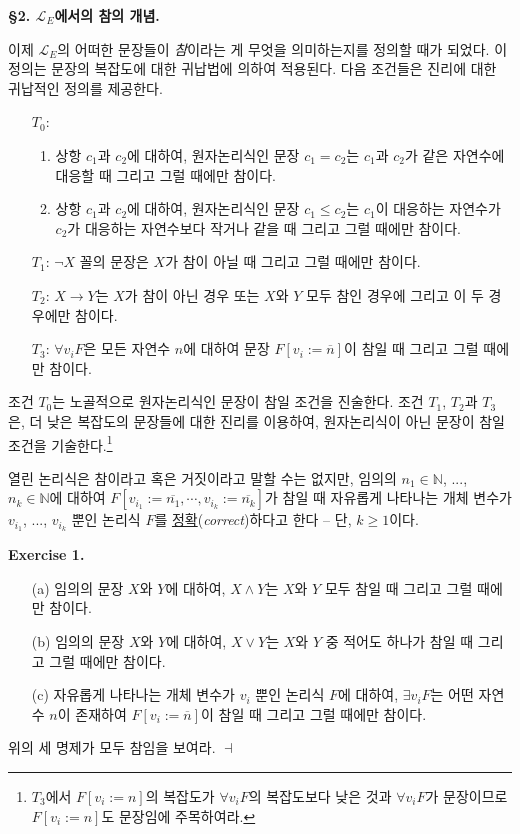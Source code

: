 \documentclass[12pt]{paper}
\newenvironment{context}[1][]
{ \noindent \textbf{{#1}.}
}
{ \hfill $ \dashv $ }
\begin{document}
\noindent \textbf{\S2. $\mathcal{L}_{E}$에서의 참의 개념.}

이제 $\mathcal{L}_{E}$의 어떠한 문장들이 \textit{참}이라는 게 무엇을 의미하는지를 정의할 때가 되었다.
이 정의는 문장의 복잡도에 대한 귀납법에 의하여 적용된다.
다음 조건들은 진리에 대한 귀납적인 정의를 제공한다.
\begin{itemize}
\item[$T_{0}$:]
\begin{enumerate}
\item 상항 $c_{1}$과 $c_{2}$에 대하여, 원자논리식인 문장 $c_{1} = c_{2}$는 $c_{1}$과 $c_{2}$가 같은 자연수에 대응할 때 그리고 그럴 때에만 참이다.
\item 상항 $c_{1}$과 $c_{2}$에 대하여, 원자논리식인 문장 $c_{1} \leq c_{2}$는 $c_{1}$이 대응하는 자연수가 $c_{2}$가 대응하는 자연수보다 작거나 같을 때 그리고 그럴 때에만 참이다.
\end{enumerate}
\item[$T_{1}$:] $\lnot X$ 꼴의 문장은 $X$가 참이 아닐 때 그리고 그럴 때에만 참이다.
\item[$T_{2}$:] $X \rightarrow Y$는 $X$가 참이 아닌 경우 또는 $X$와 $Y$ 모두 참인 경우에 그리고 이 두 경우에만 참이다.
\item[$T_{3}$:] $\forall v_{i} F$은 모든 자연수 $n$에 대하여 문장 $F \left[ v_{i} := \overline{n} \right]$이 참일 때 그리고 그럴 때에만 참이다.
\end{itemize}

조건 $T_{0}$는 노골적으로 원자논리식인 문장이 참일 조건을 진술한다.
조건 $T_{1}$, $T_{2}$과 $T_{3}$은,
더 낮은 복잡도의 문장들에 대한 진리를 이용하여,
원자논리식이 아닌 문장이 참일 조건을 기술한다.\footnote
{
$T_{3}$에서 $F \left[ v_{i} := n \right] $의 복잡도가 $\forall v_{i} F$의 복잡도보다 낮은 것과
$\forall v_{i} F$가 문장이므로 $F \left[ v_{i} := n \right]$도 문장임에 주목하여라.
}

열린 논리식은 참이라고 혹은 거짓이라고 말할 수는 없지만,
임의의 $n_{1} \in \mathbb{N}$, ..., $n_{k} \in \mathbb{N}$에 대하여 $F \left[ v_{i_{1}} := \overline{n_{1}} , \cdots , v_{i_{k}} := \overline{n_{k}} \right]$가 참일 때
자유롭게 나타나는 개체 변수가 $v_{i_{1}}$, ..., $v_{i_{k}}$ 뿐인 논리식 $F$를 \underline{정확}(\textit{correct})하다고 한다 --
단, $k \geq 1$이다.

\begin{context}[Exercise 1]
\begin{enumerate}
\item[(a)] 임의의 문장 $X$와 $Y$에 대하여, $X \land Y$는 $X$와 $Y$ 모두 참일 때 그리고 그럴 때에만 참이다.
\item[(b)] 임의의 문장 $X$와 $Y$에 대하여, $X \lor Y$는 $X$와 $Y$ 중 적어도 하나가 참일 때 그리고 그럴 때에만 참이다.
\item[(c)] 자유롭게 나타나는 개체 변수가 $v_{i}$ 뿐인 논리식 $F$에 대하여, $\exists v_{i} F$는 어떤 자연수 $n$이 존재하여 $F \left[ v_{i} := \overline{n} \right]$이 참일 때 그리고 그럴 때에만 참이다.
\end{enumerate}

위의 세 명제가 모두 참임을 보여라.
\end{context}
\end{document}
